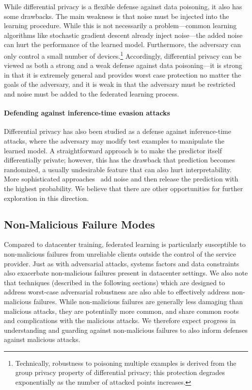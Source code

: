 \documentclass[11pt]{article}
\begin{document}
While differential privacy is a flexible defense against data poisoning, it also has some drawbacks. The main weakness is that noise must be injected into the learning procedure. While this is not necessarily a problem---common learning algorithms like stochastic gradient descent already inject noise---the added noise can hurt the performance of the learned model. Furthermore, the adversary can only control a small number of devices.\footnote{Technically, robustness to poisoning multiple examples is derived from the group privacy property of differential privacy; this protection degrades exponentially as the number of attacked points increases.} Accordingly, differential privacy can be viewed as both a strong and a weak defense against data poisoning---it is strong in that it is extremely general and provides worst case protection no matter the goals of the adversary, and it is weak in that the adversary must be restricted and noise must be added to the federated learning process.

\paragraph{Defending against inference-time evasion attacks}\label{p:inference-time-evasion-defense}
Differential privacy has also been studied as a defense against inference-time attacks, where the adversary may modify test examples to manipulate the learned model. A straightforward approach is to make the predictor itself differentially private; however, this has the drawback that prediction becomes randomized, a usually undesirable feature that can also hurt interpretability. More sophisticated approaches~\citep{DBLP:conf/sp/LecuyerAG0J19} add noise and then release the prediction with the highest probability. We believe that there are other opportunities for further exploration in this direction.


\subsection{Non-Malicious Failure Modes}
\label{subsec:failures}

Compared to datacenter training, federated learning is particularly susceptible to non-malicious failures from unreliable clients outside the control of the service provider. Just as with adversarial attacks, systems factors and data constraints also exacerbate non-malicious failures present in datacenter settings. We also note that techniques (described in the following sections) which are designed to address worst-case adversarial robustness are also able to effectively address non-malicious failures. While non-malicious failures are generally less damaging than malicious attacks, they are potentially more common, and share common roots and complications with the malicious attacks. We therefore expect progress in understanding and guarding against non-malicious failures to also inform defenses against malicious attacks.
\end{document}
